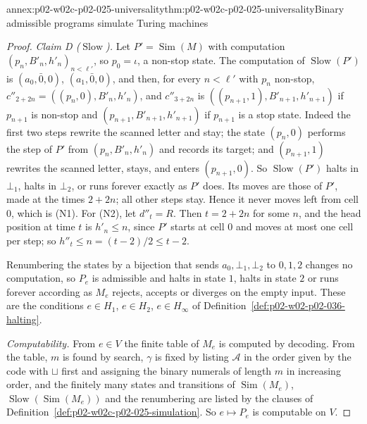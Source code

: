 \begin{annexitem}{annex:p02-w02c-p02-025-universality}{thm:p02-w02c-p02-025-universality}{Binary admissible programs simulate Turing machines}
\begin{proof}
\emph{Claim D (\(\operatorname{Slow}\)).}  Let \(P'=\operatorname{Sim}(M)\) with
computation \((p_n,B'_n,h'_n)_{n<\ell'}\), so \(p_0=\iota\), a non-stop state.
The computation of \(\operatorname{Slow}(P')\) is
\((a_0,\bar0,0)\), \((a_1,\bar0,0)\), and then, for every \(n<\ell'\) with
\(p_n\) non-stop,
\(c''_{2+2n}=((p_n,0),B'_n,h'_n)\), and \(c''_{3+2n}\) is
\(((p_{n+1},1),B'_{n+1},h'_{n+1})\) if \(p_{n+1}\) is non-stop and
\((p_{n+1},B'_{n+1},h'_{n+1})\) if \(p_{n+1}\) is a stop state.
Indeed the first two steps rewrite the scanned letter and stay; the state
\((p_n,0)\) performs the step of \(P'\) from \((p_n,B'_n,h'_n)\) and records its
target; and \((p_{n+1},1)\) rewrites the scanned letter, stays, and enters
\((p_{n+1},0)\).  So \(\operatorname{Slow}(P')\) halts in \(\bot_1\), halts in
\(\bot_2\), or runs forever exactly as \(P'\) does.  Its moves are those of
\(P'\), made at the times \(2+2n\); all other steps stay.  Hence it never moves
left from cell \(0\), which is (N1).  For (N2), let \(d''_t=R\).  Then
\(t=2+2n\) for some \(n\), and the head position at time \(t\) is \(h'_n\leq n\),
since \(P'\) starts at cell \(0\) and moves at most one cell per step; so
\(h''_t\leq n=(t-2)/2\leq t-2\).

Renumbering the states by a bijection that sends \(a_0,\bot_1,\bot_2\) to
\(0,1,2\) changes no computation, so \(P_e\) is admissible and halts in state
\(1\), halts in state \(2\) or runs forever according as \(M_e\) rejects, accepts
or diverges on the empty input.  These are the conditions \(e\in H_1\),
\(e\in H_2\), \(e\in H_\infty\) of Definition~\ref{def:p02-w02-p02-036-halting}.

\emph{Computability.}  From \(e\in V\) the finite table of \(M_e\) is computed
by decoding.  From the table, \(m\) is found by search, \(\gamma\) is fixed by
listing \(\mathcal A\) in the order given by the code with \(\sqcup\) first and
assigning the binary numerals of length \(m\) in increasing order, and the
finitely many states and transitions of \(\operatorname{Sim}(M_e)\),
\(\operatorname{Slow}(\operatorname{Sim}(M_e))\) and the renumbering are listed
by the clauses of Definition~\ref{def:p02-w02c-p02-025-simulation}.  So
\(e\mapsto P_e\) is computable on \(V\).
\end{proof}
\end{annexitem}

